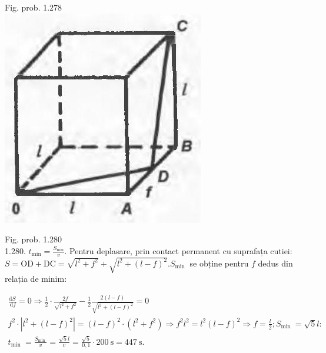\documentclass[10pt]{article}
\begin{document}
Fig. prob. 1.278\\
\includegraphics[max width=\textwidth, center]{2025_07_01_5b3ff9fa0d508c8e9f17g-259(1)}

Fig. prob. 1.280\\
1.280. $t_{\min }=\frac{S_{\min }}{v}$. Pentru deplasare, prin contact permanent cu suprafața cutiei: $S=\mathrm{OD}+\mathrm{DC}=\sqrt{l^{2}+f^{2}}+\sqrt{l^{2}+(l-f)^{2}} . S_{\text {min }}$ se obține pentru $f$ dedus din relația de minim:

$$
\begin{gathered}
\frac{\mathrm{d} S}{\mathrm{~d} f}=0 \Rightarrow \frac{1}{2} \cdot \frac{2 f}{\sqrt{l^{2}+f^{2}}}-\frac{1}{2} \frac{2(l-f)}{\sqrt{l^{2}+(l-f)^{2}}}=0 \\
f^{2} \cdot\left|l^{2}+(l-f)^{2}\right|=(l-f)^{2} \cdot\left(l^{2}+f^{2}\right) \Rightarrow f^{2} l^{2}=l^{2}(l-f)^{2} \Rightarrow f=\frac{l}{2} ; S_{\text {min }}=\sqrt{5} l: \\
t_{\text {min }}=\frac{S_{\text {min }}}{v}=\frac{\sqrt{5} l}{v}=\frac{\sqrt{5}}{0,1} \cdot 200 \mathrm{~s}=447 \mathrm{~s} .
\end{gathered}
$$
\end{document}
